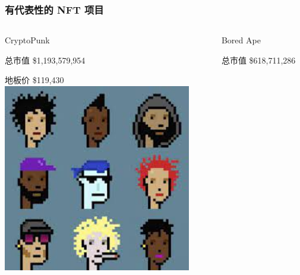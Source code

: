 \documentclass{beamer}
\begin{document}
\begin{frame}
    \frametitle{有代表性的 NFT 项目}
    \begin{columns}
        \begin{column}{0.33\textwidth}
            \centering
            CryptoPunk

            总市值 \$1,193,579,954

            地板价 \$119,430
            \includegraphics[width=0.9\textwidth]{cryptopunk.jpg}
        \end{column}
        \begin{column}{0.33\textwidth}
            \centering
            Bored Ape

            总市值 \$618,711,286


\end{column}
\end{columns}
\end{frame}
\end{document}
